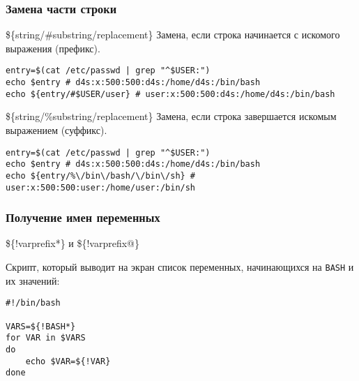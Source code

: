 \begin{frame}[fragile]
	\frametitle{Замена части строки}

	\begin{block}{\$\{string/\#substring/replacement\}}
		Замена, если строка начинается с искомого выражения (префикс).

	\begin{lstlisting}
entry=$(cat /etc/passwd | grep "^$USER:")
echo $entry # d4s:x:500:500:d4s:/home/d4s:/bin/bash
echo ${entry/#$USER/user} # user:x:500:500:d4s:/home/d4s:/bin/bash
	\end{lstlisting}
	\end{block}

	\pause
	\begin{block}{\$\{string/\%substring/replacement\}}
		Замена, если строка завершается искомым выражением (суффикс).

	\begin{lstlisting}
entry=$(cat /etc/passwd | grep "^$USER:")
echo $entry # d4s:x:500:500:d4s:/home/d4s:/bin/bash
echo ${entry/%\/bin\/bash/\/bin\/sh} # user:x:500:500:user:/home/user:/bin/sh
	\end{lstlisting}
	\end{block}

\end{frame}

\begin{frame}[fragile]
	\frametitle{Получение имен переменных}

	\begin{block}{ \$\{!varprefix*\} и \$\{!varprefix@\} }

		Скрипт, который выводит на экран список переменных, начинающихся на {\tt BASH} и их значений:
	\begin{lstlisting}
#!/bin/bash

VARS=${!BASH*}
for VAR in $VARS
do
    echo $VAR=${!VAR}
done
	\end{lstlisting}
	\end{block}
\end{frame}

